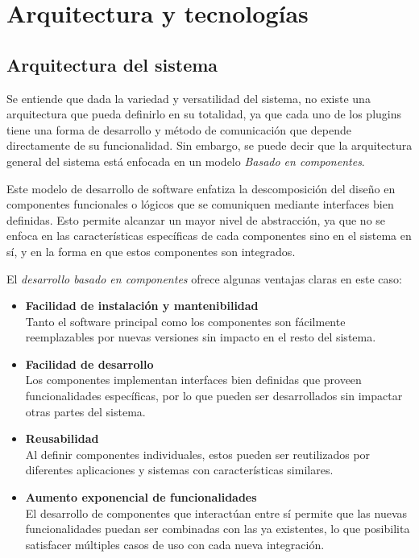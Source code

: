 \section{Arquitectura y tecnologías} \label{sec:arq}

    \subsection{Arquitectura del sistema}

        Se entiende que dada la variedad y versatilidad del sistema, no existe una arquitectura que pueda definirlo en su totalidad, ya que cada uno de los plugins tiene una forma de desarrollo y método de comunicación que depende directamente de su funcionalidad. Sin embargo, se puede decir que la arquitectura general del sistema está enfocada en un modelo \textit{Basado en componentes}.
        
        Este modelo de desarrollo de software enfatiza la descomposición del diseño en componentes funcionales o lógicos que se comuniquen mediante interfaces bien definidas. Esto permite alcanzar un mayor nivel de abstracción, ya que no se enfoca en las características específicas de cada componentes sino en el sistema en sí, y en la forma en que estos componentes son integrados.
        
        El \textit{desarrollo basado en componentes} ofrece algunas ventajas claras en este caso:
        \begin{itemize}
            \item \textbf{Facilidad de instalación y mantenibilidad} \\
            Tanto el software principal como los componentes son fácilmente reemplazables por nuevas versiones sin impacto en el resto del sistema.
            
            \item \textbf{Facilidad de desarrollo} \\
            Los componentes implementan interfaces bien definidas que proveen funcionalidades específicas, por lo que pueden ser desarrollados sin impactar otras partes del sistema.
            
            \item \textbf{Reusabilidad} \\
            Al definir componentes individuales, estos pueden ser reutilizados por diferentes aplicaciones y sistemas con características similares.
            
            \item \textbf{Aumento exponencial de funcionalidades} \\
            El desarrollo de componentes que interactúan entre sí permite que las nuevas funcionalidades puedan ser combinadas con las ya existentes, lo que posibilita satisfacer múltiples casos de uso con cada nueva integración.
        \end{itemize}

